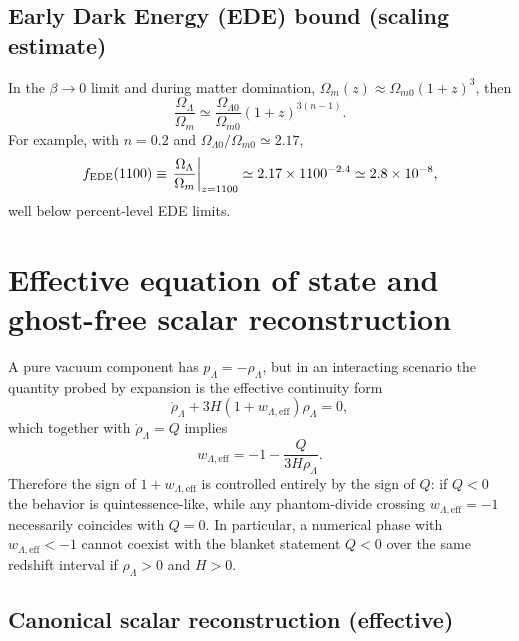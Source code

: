 \documentclass[pdflatex,sn-mathphys-num]{sn-jnl}%
\newcommand{\Omm}{\Omega_{m0}}
\newcommand{\OmL}{\Omega_{\Lambda0}}
\begin{document}
\subsection{Early Dark Energy (EDE) bound (scaling estimate)}
\label{subsec:EDE}

In the $\beta\to 0$ limit and during matter domination,
$\Omega_m(z)\approx \Omm(1+z)^3$, then
\begin{equation}
\frac{\Omega_\Lambda}{\Omega_m}
\simeq \frac{\OmL}{\Omm}(1+z)^{3(n-1)}.
\label{eq:EDE_scaling}
\end{equation}
For example, with $n=0.2$ and $\OmL/\Omm\simeq 2.17$,
\begin{equation}
f_{\rm EDE}(1100)\equiv \left.\frac{\Omega_\Lambda}{\Omega_m}\right|_{z=1100}
\simeq 2.17\times 1100^{-2.4}\simeq 2.8\times 10^{-8},
\end{equation}
well below percent-level EDE limits.

\section{Effective equation of state and ghost-free scalar reconstruction}
\label{sec:quintessence_eff}

A pure vacuum component has $p_\Lambda=-\rho_\Lambda$, but in an interacting
scenario the quantity probed by expansion is the effective continuity form
\begin{equation}
\dot\rho_\Lambda + 3H(1+w_{\Lambda,\mathrm{eff}})\rho_\Lambda = 0,
\end{equation}
which together with $\dot\rho_\Lambda=Q$ implies
\begin{equation}
w_{\Lambda,\mathrm{eff}}
=
-1-\frac{Q}{3H\rho_\Lambda}.
\label{eq:weff}
\end{equation}
Therefore the sign of $1+w_{\Lambda,\mathrm{eff}}$ is controlled entirely by
the sign of $Q$: if $Q<0$ the behavior is quintessence-like, while any
phantom-divide crossing $w_{\Lambda,\mathrm{eff}}=-1$ necessarily coincides
with $Q=0$. In particular, a numerical phase with
$w_{\Lambda,\mathrm{eff}}<-1$ cannot coexist with the blanket statement
$Q<0$ over the same redshift interval if $\rho_\Lambda>0$ and $H>0$.

\subsection{Canonical scalar reconstruction (effective)}
\label{subsec:scalar_recon}
\end{document}

